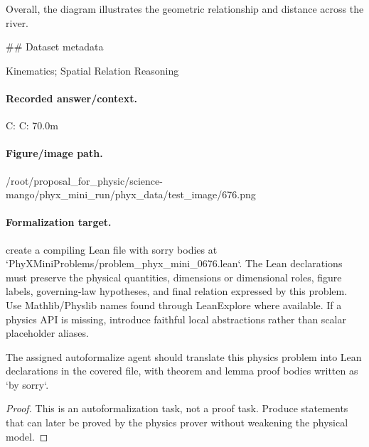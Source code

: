 Overall, the diagram illustrates the geometric relationship and distance across the river.

\#\# Dataset metadata

Kinematics; Spatial Relation Reasoning

\paragraph{Recorded answer/context.}
C: C: 70.0m

\paragraph{Figure/image path.}
/root/proposal\_for\_physic/science-mango/phyx\_mini\_run/phyx\_data/test\_image/676.png

\paragraph{Formalization target.}
create a compiling Lean file with sorry bodies at `PhyXMiniProblems/problem\_phyx\_mini\_0676.lean`. The Lean declarations must preserve the physical quantities, dimensions or dimensional roles, figure labels, governing-law hypotheses, and final relation expressed by this problem.
Use Mathlib/Physlib names found through LeanExplore where available. If a physics API is missing, introduce faithful local abstractions rather than scalar placeholder aliases.

\begin{theorem}
\label{thm:physics:phyx_mini_0676:target}
The assigned autoformalize agent should translate this physics problem into Lean declarations in the covered file, with theorem and lemma proof bodies written as `by sorry`.
\end{theorem}
\begin{proof}
This is an autoformalization task, not a proof task. Produce statements that can later be proved by the physics prover without weakening the physical model.
\end{proof}

